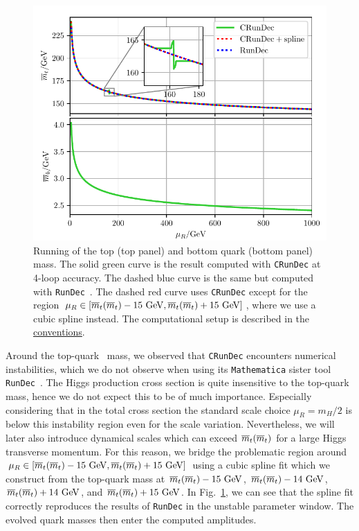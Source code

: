 \begin{figure}[h]
\centering
\includegraphics[width=\figurewidth]{Images/mass_running.pdf}
\caption{Running of the top (top panel) and bottom quark (bottom panel) mass. The solid green curve is the result computed with \texttt{CRunDec} at 4-loop accuracy. The dashed blue curve is the same but computed with \texttt{RunDec}~\cite{Chetyrkin:2000yt}. The dashed red curve uses \texttt{CRunDec} except for the region $\mu_R \in [\msMass{t}-15 \ \mathrm{GeV}, \msMass{t} + 15 \ \mathrm{GeV}]$, where we use a cubic spline instead. The computational setup is described in the \hyperref[chap:notation_and_conventions]{conventions}.}
\label{fig:5:running}
\end{figure}
Around the top-quark \MS\ mass, we observed that \texttt{CRunDec} encounters numerical instabilities, which we do not observe when using its \texttt{Mathematica} sister tool \texttt{RunDec}~\cite{Chetyrkin:2000yt}. The Higgs production cross section is quite insensitive to the top-quark mass, hence we do not expect this to be of much importance. Especially considering that in the total cross section the standard scale choice $\mu_R = m_H/2$ is below this instability region even for the scale variation. Nevertheless, we will later also introduce dynamical scales which can exceed $\overline{m}_{t}\!\left(\overline{m}_{t} \right)$ for a large Higgs transverse momentum. For this reason, we bridge the problematic region around $\mu_R \in [\msMass{t} - 15 \ \mathrm{GeV}, \msMass{t} + 15\ \mathrm{GeV}]$ using a cubic spline fit which we construct from the top-quark mass at $\overline{m}_{t}\!\left(\overline{m}_{t} \right) - 15 \ \mathrm{GeV}$, $\overline{m}_{t}\!\left(\overline{m}_{t} \right) - 14 \ \mathrm{GeV}$,$\overline{m}_{t}\!\left(\overline{m}_{t} \right) + 14 \ \mathrm{GeV}$, and $\overline{m}_{t}\!\left(\overline{m}_{t} \right) + 15 \ \mathrm{GeV}$. In Fig.~\ref{fig:5:running}, we can see that the spline fit correctly reproduces the results of \texttt{RunDec} in the unstable parameter window. The evolved quark masses then enter the computed amplitudes.

